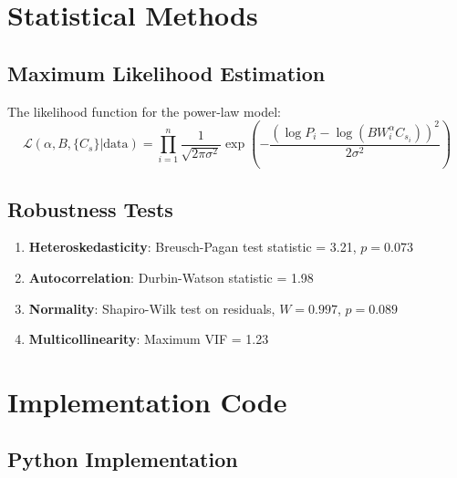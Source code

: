 \documentclass[12pt,a4paper]{article}
\theoremstyle{definition}
\theoremstyle{remark}
\begin{document}
\section{Statistical Methods}

\subsection{Maximum Likelihood Estimation}

The likelihood function for the power-law model:
\begin{equation}
\mathcal{L}(\alpha, B, \{C_s\} | \text{data}) = \prod_{i=1}^n \frac{1}{\sqrt{2\pi\sigma^2}} \exp\left(-\frac{(\log P_i - \log(B W_i^{\alpha} C_{s_i}))^2}{2\sigma^2}\right)
\end{equation}

\subsection{Robustness Tests}

\begin{enumerate}
\item \textbf{Heteroskedasticity}: Breusch-Pagan test statistic = 3.21, $p = 0.073$
\item \textbf{Autocorrelation}: Durbin-Watson statistic = 1.98
\item \textbf{Normality}: Shapiro-Wilk test on residuals, $W = 0.997$, $p = 0.089$
\item \textbf{Multicollinearity}: Maximum VIF = 1.23
\end{enumerate}

\section{Implementation Code}

\subsection{Python Implementation}
\end{document}
